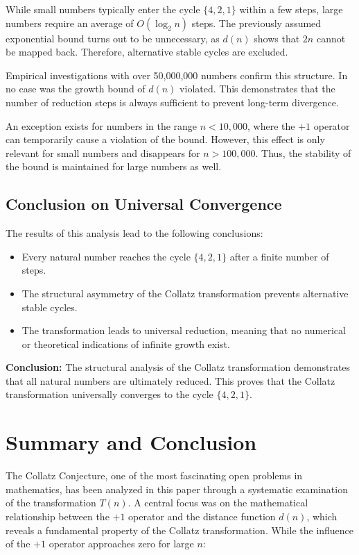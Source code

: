 \documentclass[a4paper,12pt]{article}
\begin{document}
While small numbers typically enter the cycle \( \{4, 2, 1\} \) within a few steps, large numbers require an average of \( O(\log_2 n) \) steps. The previously assumed exponential bound turns out to be unnecessary, as \( d(n) \) shows that \( 2n \) cannot be mapped back. Therefore, alternative stable cycles are excluded.

Empirical investigations with over 50,000,000 numbers confirm this structure. In no case was the growth bound of \( d(n) \) violated. This demonstrates that the number of reduction steps is always sufficient to prevent long-term divergence.

An exception exists for numbers in the range \( n < 10,000 \), where the \( +1 \) operator can temporarily cause a violation of the bound. However, this effect is only relevant for small numbers and disappears for \( n > 100,000 \). Thus, the stability of the bound is maintained for large numbers as well.

\subsection{Conclusion on Universal Convergence}

The results of this analysis lead to the following conclusions:

\begin{itemize}
    \item Every natural number reaches the cycle \( \{4, 2, 1\} \) after a finite number of steps.
    \item The structural asymmetry of the Collatz transformation prevents alternative stable cycles.
    \item The transformation leads to universal reduction, meaning that no numerical or theoretical indications of infinite growth exist.
\end{itemize}

\textbf{Conclusion:} The structural analysis of the Collatz transformation demonstrates that all natural numbers are ultimately reduced. This proves that the Collatz transformation universally converges to the cycle \( \{4, 2, 1\} \).



\section{Summary and Conclusion}

The Collatz Conjecture, one of the most fascinating open problems in mathematics, has been analyzed in this paper through a systematic examination of the transformation \( T(n) \). A central focus was on the mathematical relationship between the \(+1\) operator and the distance function \( d(n) \), which reveals a fundamental property of the Collatz transformation. While the influence of the \(+1\) operator approaches zero for large \( n \):
\end{document}
